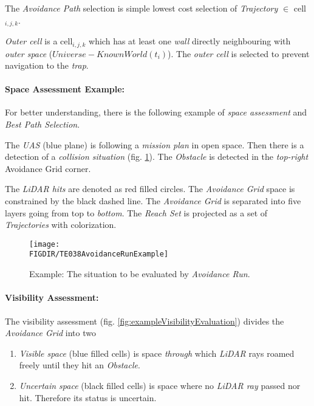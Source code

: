The \emph{Avoidance Path} selection is simple lowest cost selection of \emph{Trajectory} $\in$ cell$_{i,j,k}$.

\begin{note}
    \emph{Outer cell} is a cell$_{i,j,k}$ which has at least one \emph{wall} directly neighbouring with \emph{outer space} ($Universe - Known World (t_i)$). The \emph{outer cell} is selected to prevent navigation to the \emph{trap}.
\end{note}

\paragraph{Space Assessment Example:} For better understanding, there is the following example of \emph{space assessment} and \emph{Best Path Selection}. 


The \emph{UAS} (blue plane) is following a \emph{mission plan} in open space. Then there is a detection of a \emph{collision situation} (fig. \ref{fig:exampleSituationAvoidanceRun}). The \emph{Obstacle} is detected in the \emph{top-right} Avoidance Grid corner. 

The \emph{LiDAR hits} are denoted as red filled circles. The \emph{Avoidance Grid} space is constrained by the black dashed line. The \emph{Avoidance Grid} is separated into five layers going from top to \emph{bottom}. The \emph{Reach Set} is projected as a set of \emph{Trajectories} with colorization. 

\begin{figure}[H]
\centering
    \texttt{[image: \\FIGDIR/TE038AvoidanceRunExample]}        
    \caption{Example: The situation to be evaluated by \emph{Avoidance Run}.}
    \label{fig:exampleSituationAvoidanceRun}
\end{figure}

\paragraph{Visibility Assessment:} The visibility assessment (fig. \ref{fig:exampleVisibilityEvaluation}) divides the \emph{Avoidance Grid} into two
\begin{enumerate}
    \item \emph{Visible space} (blue filled cells) is space \emph{through} which \emph{LiDAR} rays roamed freely until they hit an \emph{Obstacle}.
    
    \item \emph{Uncertain space} (black filled cells) is space where no \emph{LiDAR ray} passed nor hit. Therefore its status is uncertain.
\end{enumerate}
 
